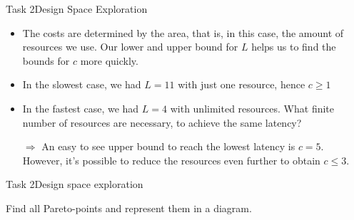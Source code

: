 \begin{frame}{Task 2}{Design Space Exploration}
    \begin{solution}
        \begin{itemize}
            \item The costs are determined by the area, that is, in this case, the amount of resources we use. Our lower and upper bound for $L$ helps us to find the bounds for $c$ more quickly.
            \item In the slowest case, we had $L = 11$ with just one resource, hence $c \geq 1$
            \item In the fastest case, we had $L = 4$ with unlimited resources. What finite number of resources are necessary, to achieve the same latency?
            \item [$\Rightarrow$] An easy to see upper bound to reach the lowest latency is $c = 5$. However, it's possible to reduce the resources even further to obtain $c \leq 3$.
        \end{itemize}
    \end{solution}
\end{frame}
\begin{frame}{Task 2}{Design space exploration}
    \begin{tasknoinc}
        Find all Pareto-points and represent them in a diagram.
    \end{tasknoinc}
\end{frame}

